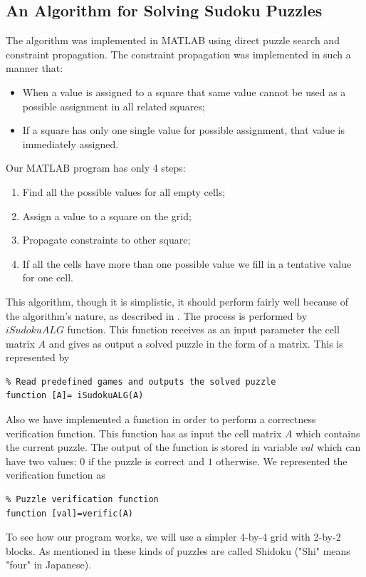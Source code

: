\documentclass[12pt,a4paper]{article} %
\begin{document}
\subsection{An Algorithm for Solving Sudoku Puzzles}
The algorithm was implemented in MATLAB using direct puzzle search and constraint propagation. The constraint propagation was implemented in such a manner that: 
\begin{itemize}
\item When a value is assigned to a square that same value cannot be used as a possible assignment in all related squares;
\item If a square has only one single value for possible assignment, that value is immediately assigned.
\end{itemize}
Our MATLAB program has only 4 steps:
\begin{enumerate}
\item Find all the possible values for all empty cells;
\item Assign a value to a square on the grid;
\item Propagate constraints to other square;
\item If all the cells have more than one possible value we fill in a tentative value for one cell.
\end{enumerate}
This algorithm, though it is simplistic, it should perform fairly well  because of the algorithm's nature, as described in \cite{norvigsolving}. The process is performed by $iSudokuALG$ function. This function receives as an input parameter the cell matrix $A$ and gives as output a solved puzzle in the form of a matrix. This is represented by
\begin{verbatim}
% Read predefined games and outputs the solved puzzle
function [A]= iSudokuALG(A)
\end{verbatim}
Also we have implemented a function in order to perform a correctness verification function. This function has as input the cell matrix $A$ which contains the current puzzle. The output of the function is stored in variable $val$ which can have two values: $0$ if the puzzle is correct and $1$ otherwise. We represented the verification function as
\begin{verbatim}
% Puzzle verification function
function [val]=verific(A)
\end{verbatim}
To see how our program works, we will use a simpler 4-by-4 grid with 2-by-2 blocks. As mentioned in \cite{crook2009pencil} these kinds of puzzles are called Shidoku ("Shi" means "four" in Japanese). 
\end{document}
